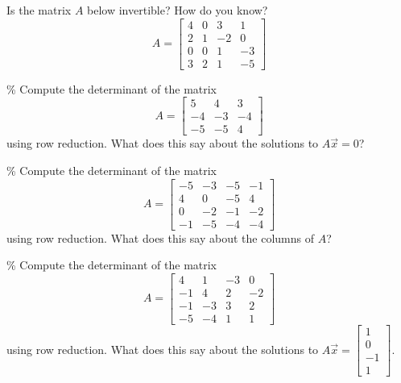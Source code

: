 \documentclass{ximera}
\begin{document}
\begin{exercise}
    Is the matrix $A$ below invertible? How do you know?
    \[ A = \begin{bmatrix}4&0&3&1 \\ 2 &1&-2&0 \\ 0&0&1&-3 \\3 & 2 & 1 & -5 \end{bmatrix} \]
\end{exercise}

\begin{exercise}\%
    Compute the determinant of the matrix
    \[ A = \begin{bmatrix}
        5 & 4  & 3\\
        -4 &-3 &-4\\
        -5 &-5 & 4
    \end{bmatrix}
    \]
    using row reduction. What does this say about the solutions to $A\vec{x} = 0$?
\end{exercise}

\begin{exercise}\%
    Compute the determinant of the matrix
    \[ A = \begin{bmatrix}
        -5 & -3 & -5 & -1\\
        4 & 0 &-5 &  4\\
        0&-2 &-1 &-2\\
        -1& -5 &-4 &-4
    \end{bmatrix}
    \]
    using row reduction. What does this say about the columns of $A$?
\end{exercise}

\begin{exercise}\%
    Compute the determinant of the matrix
    \[ A = \begin{bmatrix}
        4  & 1 & -3 &  0\\
        -1 &  4 &  2 & -2\\
        -1 & -3 & 3 & 2\\
        -5 & -4 & 1 & 1
    \end{bmatrix}
    \]
    using row reduction. What does this say about the solutions to $A\vec{x} = \left[ \begin{smallmatrix} 1 \\ 0 \\ -1 \\ 1 \end{smallmatrix} \right]$.
\end{exercise}
\end{document}
